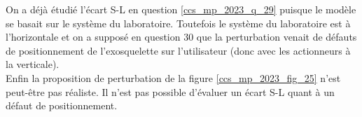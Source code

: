 \ifprof
\begin{corrige}
On a déjà étudié l'écart S-L en question \ref{ccs_mp_2023_q_29} puisque le modèle se basait sur le système du laboratoire. Toutefois le système du laboratoire est à l'horizontale et on a supposé en question 30 que la perturbation venait de défauts de positionnement de l'exosquelette sur l'utilisateur (donc avec les actionneurs à la verticale).\\

Enfin la proposition de perturbation de la figure \ref{ccs_mp_2023_fig_25} n'est peut-être pas réaliste. Il n'est pas possible d'évaluer un écart S-L quant à un défaut de positionnement.

\end{corrige}
\else
\fi

